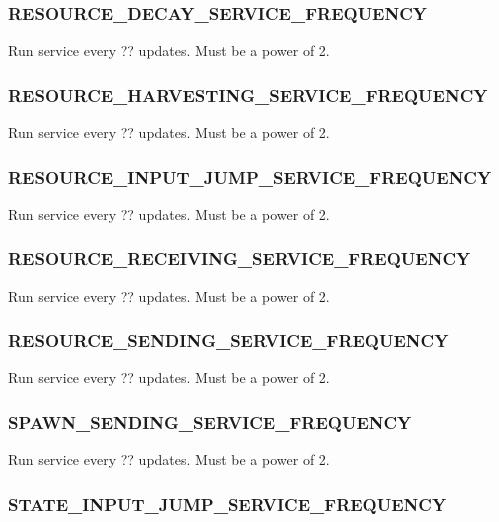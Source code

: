 \subsubsection{RESOURCE\_DECAY\_SERVICE\_FREQUENCY}


Run service every ?? updates.
Must be a power of 2.

\subsubsection{RESOURCE\_HARVESTING\_SERVICE\_FREQUENCY}


Run service every ?? updates.
Must be a power of 2.

\subsubsection{RESOURCE\_INPUT\_JUMP\_SERVICE\_FREQUENCY}


Run service every ?? updates.
Must be a power of 2.

\subsubsection{RESOURCE\_RECEIVING\_SERVICE\_FREQUENCY}


Run service every ?? updates.
Must be a power of 2.

\subsubsection{RESOURCE\_SENDING\_SERVICE\_FREQUENCY}


Run service every ?? updates.
Must be a power of 2.

\subsubsection{SPAWN\_SENDING\_SERVICE\_FREQUENCY}


Run service every ?? updates.
Must be a power of 2.

\subsubsection{STATE\_INPUT\_JUMP\_SERVICE\_FREQUENCY}

